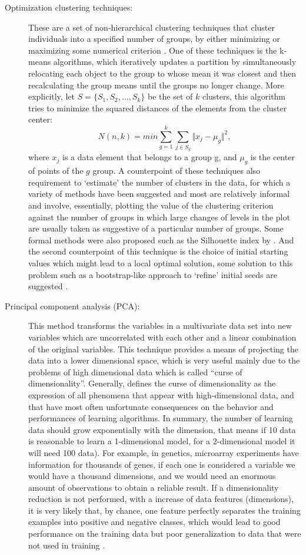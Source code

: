\begin{description}
\item[Optimization clustering techniques:]{
These are a set of non-hierarchical clustering techniques that cluster individuals into a specified number of groups, by either minimizing or maximizing some numerical criterion \cite{everitt2011hierarchical}.  One of these techniques is the k-means algorithms, which iteratively updates a partition by simultaneously relocating each object to the group to whose mean it was closest and then recalculating the group means until the groups no longer change.
More explicitly, let $S = \{S_1,S_2,\ldots,S_k\}$  be the set of $k$ clusters, this algorithm tries to minimize the squared distances of the elements from the cluster center:
$$ N(n,k) = min\sum_{g = 1}^{k}\sum_{j \in S_g}\Vert x_j - \mu_g\Vert^2,$$
where $x_j$ is a data element that belongs to a group g, and $\mu_g$ is the center of points of the $g$ group. A counterpoint of these techniques also requirement to ‘estimate’ the number of clusters in the data, for which a variety of methods
have been suggested and  most are
relatively informal and involve, essentially, plotting the value of the clustering
criterion against the number of groups in which large changes of levels in the plot are
usually taken as suggestive of a particular number of groups.
Some formal methods were also proposed such as the Silhouette index by .
And the second counterpoint of this technique is the choice of initial starting values which might lead to a local optimal solution, some solution to this problem such as a  bootstrap-like approach to ‘refine’ initial seeds are suggested \cite{steinley2003local}.
}
\item[Principal component analysis (PCA):]{
This method transforms the variables in a multivariate data set into new variables  which are uncorrelated with each other and a linear combination of the original variables. This technique provides a means of
projecting the data into a lower dimensional space, which is very useful  mainly due to the problems of high dimensional data which is called ``curse of dimensionality''.
Generally,  defines the curse of dimensionality as the expression of all phenomena that appear with high-dimensional data, and that have most often unfortunate consequences on the behavior and performances of learning algorithms. In summary, the number of learning data should grow exponentially with
the dimension, that means if 10 data  is reasonable to learn a 1-dimensional model, for a 2-dimensional model it will need 100 data). For example, in genetics, microarray experiments have information for thousands of genes, if each one is considered a variable we would have a thousand dimensions,
and we would need an enormous amount of observations to obtain a reliable result. If a dimensionality reduction is not performed, with a increase of data features (dimensions), it is very likely that, by chance, one feature perfectly separates the training examples into positive and negative classes, which would lead
to good performance on the training data but poor generalization to data that were not used in training \cite{libbrecht2015machine}.
}
\end{description}
